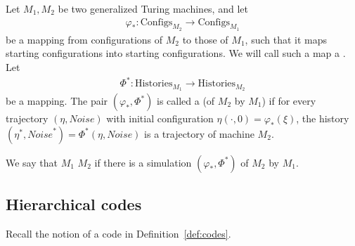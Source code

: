 \documentclass[11pt]{memoir}
\theoremstyle{definition} %
\newcommand{\Configs}{\mathrm{Configs}}
\newcommand{\Noise}{\mathit{Noise}}
\newcommand{\Histories}{\mathrm{Histories}}
\begin{document}
\begin{definition}[Simulation] \label{def:simulation-central}
Let \( M_{1},M_{2} \) be two generalized Turing machines, and let
\begin{align*}
    \varphi_{*}:\Configs_{M_{2}} \to \Configs_{M_{1}}
\end{align*}
be a mapping from configurations of \( M_{2} \)
to those of \( M_{1} \), such that it maps
starting configurations into starting configurations.
We will call such a map a .
Let
\begin{align*}
   \Phi^{*}:\Histories_{M_{1}} \to \Histories_{M_{2}}
\end{align*}
be a mapping.
The pair \( (\varphi_{*}, \Phi^{*})  \)
is called a  (of \(  M_{2}  \) by \(  M_{1}  \)) if for every
trajectory \(  (\eta, \Noise)  \) with initial
configuration \(  \eta(\cdot,0)=\varphi_{*}(\xi)  \),
the history \(  (\eta^{*},\Noise^{*})=\Phi^{*}(\eta,\Noise)  \) is
a trajectory of machine \(  M_{2}  \).

We say that \( M_{1} \)  \( M_{2} \) if there is a simulation
\( (\varphi_{*},\Phi^{*}) \) of \( M_{2} \) by \( M_{1} \).
\end{definition}

\subsection{Hierarchical codes}\label{sec:hier-codes}

Recall the notion of a code in Definition~\ref{def:codes}.
\end{document}
